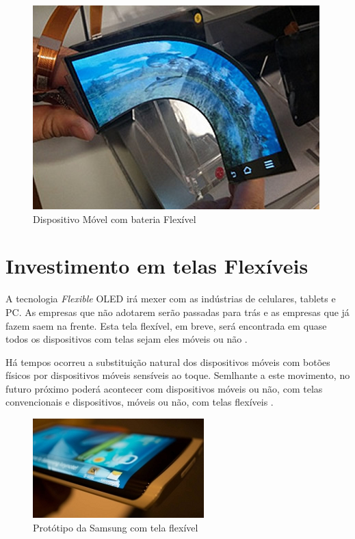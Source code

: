 \begin{figure}[!h]
  \centering
  \includegraphics[width=.60\textwidth]{./figuras/flexible-battery} 
  \caption{Dispositivo Móvel com bateria Flexível}
  \label{fig:flexible-battery} 
\end{figure}


\section{Investimento em telas Flexíveis}
\label{sec:investimento}

A tecnologia \textit{Flexible} OLED irá mexer com as indústrias de celulares, tablets e PC. As empresas que não adotarem serão passadas para trás e as empresas que já fazem saem na frente. Esta tela flexível, em breve, será encontrada em quase todos os dispositivos com telas sejam eles móveis ou não \cite{FSIJS}.

Há tempos ocorreu a substituição natural dos dispositivos móveis com botões físicos por dispositivos móveis sensíveis ao toque. Semlhante a este movimento, no futuro próximo poderá acontecer com dispositivos móveis ou não, com telas convencionais e dispositivos, móveis ou não, com telas flexíveis \cite{FSIJS}.

\begin{figure}[!h]
  \centering
  \includegraphics[width=.60\textwidth]{./figuras/oled-samsung-device} 
  \caption{Protótipo da Samsung com tela flexível}
  \label{fig:oled-samsung-device} 
\end{figure}


